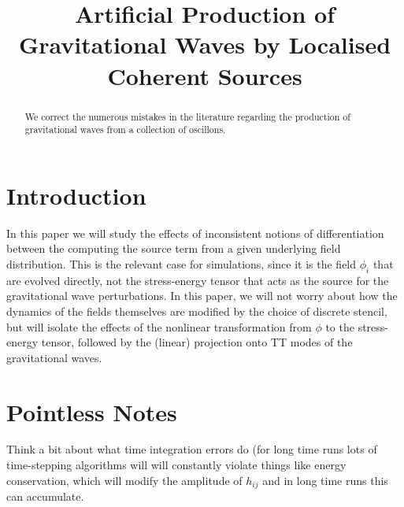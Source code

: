 \documentclass{revtex4}
\title{Artificial Production of Gravitational Waves by Localised Coherent Sources}
\begin{document}
\begin{abstract}
We correct the numerous mistakes in the literature regarding the production of gravitational waves from a collection of oscillons.
\end{abstract}
\maketitle

\section{Introduction}
In this paper we will study the effects of inconsistent notions of differentiation between the computing the source term from a given underlying field distribution.
This is the relevant case for simulations, since it is the field $\phi_i$ that are evolved directly, not the stress-energy tensor that acts as the source for the gravitational wave perturbations.
In this paper, we will not worry about how the dynamics of the fields themselves are modified by the choice of discrete stencil, but will isolate the effects of the nonlinear transformation from $\phi$ to the stress-energy tensor, followed by the (linear) projection onto TT modes of the gravitational waves.



\section{Pointless Notes}
Think a bit about what time integration errors do (for long time runs lots of time-stepping algorithms will will constantly violate things like energy conservation, which will modify the amplitude of $h_{ij}$ and in long time runs this can accumulate.
\end{document}
